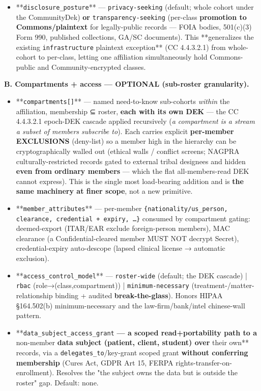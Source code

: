 \documentclass[11pt]{article}
\begin{document}
\begin{itemize}
\item **\texttt{disclosure\_posture}** — \texttt{privacy-seeking} (default; whole cohort under the CommunityDek) \textbf{or} \texttt{transparency-seeking} (per-class \textbf{promotion to Commons/plaintext} for legally-public records — FOIA bodies, 501(c)(3) Form 990, published collections, GA/SC documents). This **generalizes the existing \texttt{infrastructure} plaintext exception** (CC 4.4.3.2.1) from whole-cohort to per-class, letting one affiliation simultaneously hold Commons-public and Community-encrypted classes.
\end{itemize}


\textbf{B. Compartments + access — OPTIONAL (sub-roster granularity).}


\begin{itemize}\setlength\itemsep{0pt}
\item **\texttt{compartments[]}** — named need-to-know sub-cohorts \textit{within} the affiliation, membership ⊆ roster, \textbf{each with its own DEK} — the CC 4.4.3.2.1 epoch-DEK cascade applied recursively (\textit{a compartment is a stream a subset of members subscribe to}). Each carries explicit \textbf{per-member EXCLUSIONS} (deny-list) so a member high in the hierarchy can be cryptographically walled out (ethical walls / conflict screens; NAGPRA culturally-restricted records gated to external tribal designees and hidden \textbf{even from ordinary members} — which the flat all-members-read DEK cannot express). This is the single most load-bearing addition and is \textbf{the same machinery at finer scope}, not a new primitive.
\item **\texttt{member\_attributes}** — per-member \texttt{\{nationality/us\_person, clearance, credential + expiry, …\}} consumed by compartment gating: deemed-export (ITAR/EAR exclude foreign-person members), MAC clearance (a Confidential-cleared member MUST NOT decrypt Secret), credential-expiry auto-descope (lapsed clinical license → automatic exclusion).
\item **\texttt{access\_control\_model}** — \texttt{roster-wide} (default; the DEK cascade) | \texttt{rbac} (role→(class,compartment)) | \texttt{minimum-necessary} (treatment-/matter-relationship binding + audited \textbf{break-the-glass}). Honors HIPAA §164.502(b) minimum-necessary and the law-firm/bank/intel chinese-wall pattern.
\item **\texttt{data\_subject\_access\_grant}\textbf{ — a scoped read+portability path to a }non-member\textbf{ data subject (patient, client, student) over }their own** records, via a \texttt{delegates\_to}/key-grant scoped grant \textbf{without conferring membership} (Cures Act, GDPR Art 15, FERPA rights-transfer-on-enrollment). Resolves the "the subject owns the data but is outside the roster" gap. Default: none.

\end{itemize}
\end{document}

